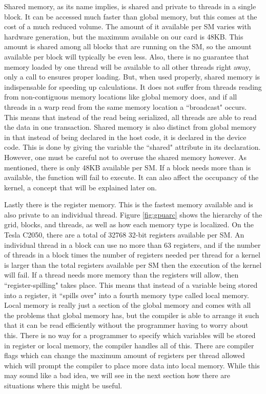 Shared memory, as its name implies, is shared and private to threads in a single block. It can be accessed much faster than global memory, but this comes at the cost of a much reduced volume. The amount of it available per SM varies with hardware generation, but the maximum available on our card is 48KB. This amount is shared among all blocks that are running on the SM, so the amount available per block will typically be even less. Also, there is no guarantee that memory loaded by one thread will be available to all other threads right away, only a call to  ensures proper loading. But, when used properly, shared memory is indispensable for speeding up calculations. It does not suffer from threads reading from non-contiguous memory locations like global memory does, and if all threads in a warp read from the same memory location a ``broadcast" occurs. This means that instead of the read being serialized, all threads are able to read the data in one transaction. Shared memory is also distinct from global memory in that instead of being declared in the host code, it is declared in the device code. This is done by giving the variable the ``shared" attribute in its declaration. However, one must be careful not to overuse the shared memory however. As mentioned, there is only 48KB available per SM. If a block needs more than is available, the function will fail to execute. It can also affect the occupancy of the kernel, a concept that will be explained later on.

Lastly there is the register memory. This is the fastest memory available and is also private to an individual thread. Figure \ref{fig:gpuarc} shows the hierarchy of the grid, blocks, and threads, as well as how each memory type is localized. On the Tesla C2050, there are a total of 32768 32-bit registers available per SM. An individual thread in a block can use no more than 63 registers, and if the number of threads in a block times the number of registers needed per thread for a kernel is larger than the total registers available per SM then the execution of the kernel will fail. If a thread needs more memory than the registers will allow, then ``register-spilling" takes place. This means that instead of a variable being stored into a register, it ``spills over" into a fourth memory type called local memory. Local memory is really just a section of the global memory and comes with all the problems that global memory has, but the compiler is able to arrange it such that it can be read efficiently without the programmer having to worry about this. There is no way for a programmer to specify which variables will be stored in register or local memory, the compiler handles all of this. There are compiler flags which can change the maximum amount of registers per thread allowed which will prompt the compiler to place more data into local memory. While this may sound like a bad idea, we will see in the next section how there are situations where this might be useful.

